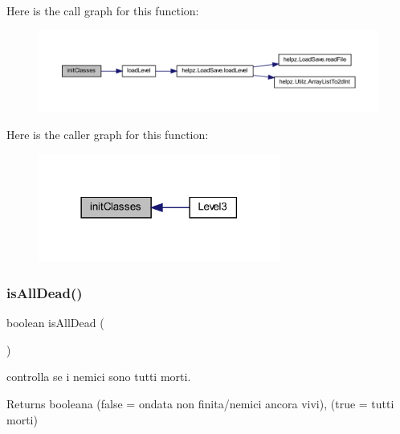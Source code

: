 Here is the call graph for this function\+:
\nopagebreak
\begin{figure}[H]
\begin{center}
\leavevmode
\includegraphics[width=350pt]{classscenes_1_1_level3_afe125d345675ffefe8da7e96d39773f3_cgraph}
\end{center}
\end{figure}
Here is the caller graph for this function\+:\nopagebreak
\begin{figure}[H]
\begin{center}
\leavevmode
\includegraphics[width=225pt]{classscenes_1_1_level3_afe125d345675ffefe8da7e96d39773f3_icgraph}
\end{center}
\end{figure}
\mbox{\label{classscenes_1_1_level3_acd1846d50c3d8678777f9ab6716f5cf3}} 
\subsubsection{\texorpdfstring{is\+All\+Dead()}{isAllDead()}}
{\footnotesize\ttfamily boolean is\+All\+Dead (\begin{DoxyParamCaption}{ }\end{DoxyParamCaption})\hspace{0.3cm}{\ttfamily [private]}}



controlla se i nemici sono tutti morti. 

\begin{DoxyReturn}{Returns}
booleana (false = ondata non finita/nemici ancora vivi), (true = tutti morti) 
\end{DoxyReturn}


